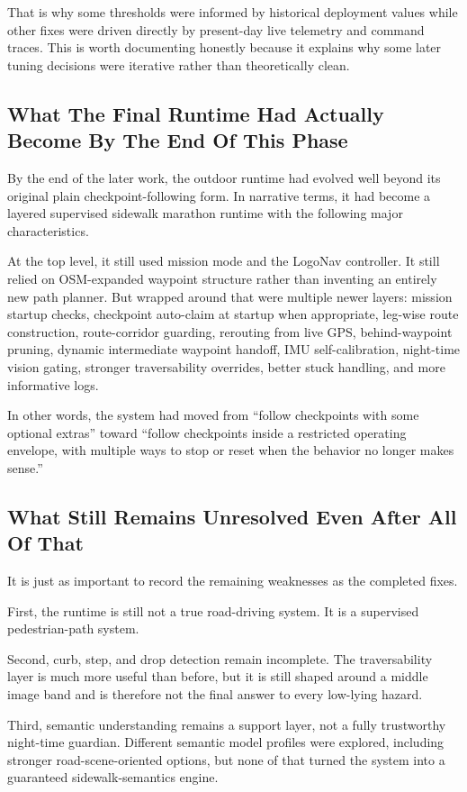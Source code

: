 \documentclass[11pt]{article}
\begin{document}
That is why some thresholds were informed by historical deployment values while other fixes were driven directly by present-day live telemetry and command traces. This is worth documenting honestly because it explains why some later tuning decisions were iterative rather than theoretically clean.

\subsection{What The Final Runtime Had Actually Become By The End Of This Phase}
By the end of the later work, the outdoor runtime had evolved well beyond its original plain checkpoint-following form. In narrative terms, it had become a layered supervised sidewalk marathon runtime with the following major characteristics.

At the top level, it still used mission mode and the LogoNav controller. It still relied on OSM-expanded waypoint structure rather than inventing an entirely new path planner. But wrapped around that were multiple newer layers: mission startup checks, checkpoint auto-claim at startup when appropriate, leg-wise route construction, route-corridor guarding, rerouting from live GPS, behind-waypoint pruning, dynamic intermediate waypoint handoff, IMU self-calibration, night-time vision gating, stronger traversability overrides, better stuck handling, and more informative logs.

In other words, the system had moved from ``follow checkpoints with some optional extras'' toward ``follow checkpoints inside a restricted operating envelope, with multiple ways to stop or reset when the behavior no longer makes sense.''

\subsection{What Still Remains Unresolved Even After All Of That}
It is just as important to record the remaining weaknesses as the completed fixes.

First, the runtime is still not a true road-driving system. It is a supervised pedestrian-path system.

Second, curb, step, and drop detection remain incomplete. The traversability layer is much more useful than before, but it is still shaped around a middle image band and is therefore not the final answer to every low-lying hazard.

Third, semantic understanding remains a support layer, not a fully trustworthy night-time guardian. Different semantic model profiles were explored, including stronger road-scene-oriented options, but none of that turned the system into a guaranteed sidewalk-semantics engine.
\end{document}
